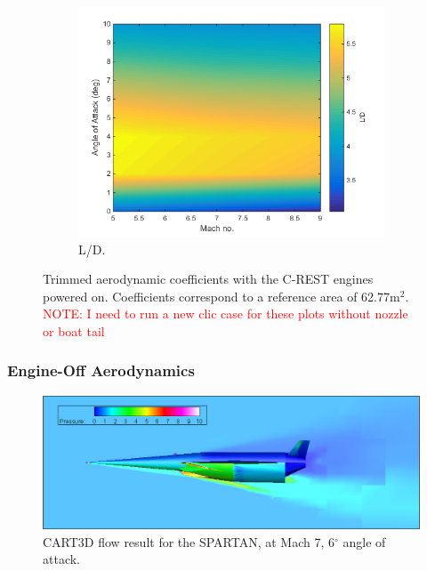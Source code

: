 \begin{figure}[ht]
\begin{subfigure}{.5\textwidth}
				\includegraphics[width=0.99\linewidth]{figures/3_vehicle_design/LD-EngineOn}
				\caption{L/D.}
				\label{fig:LD-EngineOn}
			\end{subfigure}
			\caption{Trimmed aerodynamic coefficients with the C-REST engines powered on. Coefficients correspond to a reference area of 62.77m$^2$. \textcolor{red}{NOTE: I need to run a new clic case for these plots without nozzle or boat tail}}
			\label{fig:EngineOnAero}
		\end{figure}
		

\subsubsection{Engine-Off Aerodynamics}


\begin{figure}[ht]
	\centering
	\includegraphics[width=0.9\linewidth]{figures/3_vehicle_design/M7AoA6}
	\caption{CART3D flow result for the SPARTAN, at Mach 7, 6$^\circ$ angle of attack.}
	\label{fig:M7AoA6}
\end{figure}

